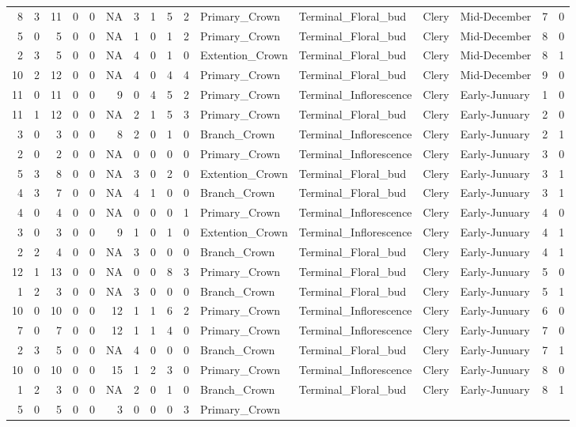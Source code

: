 \documentclass[]{article}
\begin{document}
\begin{longtable}[]{@{}rrrrrrrrrrllllrl@{}}
8 & 3 & 11 & 0 & 0 & NA & 3 & 1 & 5 & 2 & Primary\_Crown &
Terminal\_Floral\_bud & Clery & Mid-December & 7 & 0\tabularnewline
5 & 0 & 5 & 0 & 0 & NA & 1 & 0 & 1 & 2 & Primary\_Crown &
Terminal\_Floral\_bud & Clery & Mid-December & 8 & 0\tabularnewline
2 & 3 & 5 & 0 & 0 & NA & 4 & 0 & 1 & 0 & Extention\_Crown &
Terminal\_Floral\_bud & Clery & Mid-December & 8 & 1\tabularnewline
10 & 2 & 12 & 0 & 0 & NA & 4 & 0 & 4 & 4 & Primary\_Crown &
Terminal\_Floral\_bud & Clery & Mid-December & 9 & 0\tabularnewline
11 & 0 & 11 & 0 & 0 & 9 & 0 & 4 & 5 & 2 & Primary\_Crown &
Terminal\_Inflorescence & Clery & Early-Junuary & 1 & 0\tabularnewline
11 & 1 & 12 & 0 & 0 & NA & 2 & 1 & 5 & 3 & Primary\_Crown &
Terminal\_Floral\_bud & Clery & Early-Junuary & 2 & 0\tabularnewline
3 & 0 & 3 & 0 & 0 & 8 & 2 & 0 & 1 & 0 & Branch\_Crown &
Terminal\_Inflorescence & Clery & Early-Junuary & 2 & 1\tabularnewline
2 & 0 & 2 & 0 & 0 & NA & 0 & 0 & 0 & 0 & Primary\_Crown &
Terminal\_Inflorescence & Clery & Early-Junuary & 3 & 0\tabularnewline
5 & 3 & 8 & 0 & 0 & NA & 3 & 0 & 2 & 0 & Extention\_Crown &
Terminal\_Floral\_bud & Clery & Early-Junuary & 3 & 1\tabularnewline
4 & 3 & 7 & 0 & 0 & NA & 4 & 1 & 0 & 0 & Branch\_Crown &
Terminal\_Floral\_bud & Clery & Early-Junuary & 3 & 1\tabularnewline
4 & 0 & 4 & 0 & 0 & NA & 0 & 0 & 0 & 1 & Primary\_Crown &
Terminal\_Inflorescence & Clery & Early-Junuary & 4 & 0\tabularnewline
3 & 0 & 3 & 0 & 0 & 9 & 1 & 0 & 1 & 0 & Extention\_Crown &
Terminal\_Inflorescence & Clery & Early-Junuary & 4 & 1\tabularnewline
2 & 2 & 4 & 0 & 0 & NA & 3 & 0 & 0 & 0 & Branch\_Crown &
Terminal\_Floral\_bud & Clery & Early-Junuary & 4 & 1\tabularnewline
12 & 1 & 13 & 0 & 0 & NA & 0 & 0 & 8 & 3 & Primary\_Crown &
Terminal\_Floral\_bud & Clery & Early-Junuary & 5 & 0\tabularnewline
1 & 2 & 3 & 0 & 0 & NA & 3 & 0 & 0 & 0 & Branch\_Crown &
Terminal\_Floral\_bud & Clery & Early-Junuary & 5 & 1\tabularnewline
10 & 0 & 10 & 0 & 0 & 12 & 1 & 1 & 6 & 2 & Primary\_Crown &
Terminal\_Inflorescence & Clery & Early-Junuary & 6 & 0\tabularnewline
7 & 0 & 7 & 0 & 0 & 12 & 1 & 1 & 4 & 0 & Primary\_Crown &
Terminal\_Inflorescence & Clery & Early-Junuary & 7 & 0\tabularnewline
2 & 3 & 5 & 0 & 0 & NA & 4 & 0 & 0 & 0 & Branch\_Crown &
Terminal\_Floral\_bud & Clery & Early-Junuary & 7 & 1\tabularnewline
10 & 0 & 10 & 0 & 0 & 15 & 1 & 2 & 3 & 0 & Primary\_Crown &
Terminal\_Inflorescence & Clery & Early-Junuary & 8 & 0\tabularnewline
1 & 2 & 3 & 0 & 0 & NA & 2 & 0 & 1 & 0 & Branch\_Crown &
Terminal\_Floral\_bud & Clery & Early-Junuary & 8 & 1\tabularnewline
5 & 0 & 5 & 0 & 0 & 3 & 0 & 0 & 0 & 3 & Primary\_Crown &

\end{longtable}
\end{document}
